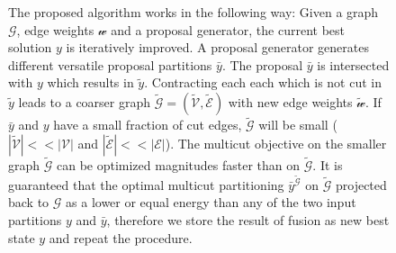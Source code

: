 \begin{figure}[H]
\caption{
    The proposed algorithm works in the following way:
    Given a graph $\mathcal{G}$, edge weights $\mathcal{w}$ and
    a proposal generator, the current best solution $y$ is iteratively improved.
    A proposal generator generates different versatile
    proposal partitions $\bar{y}$.
    The proposal  $\bar{y}$ is intersected with $y$ which results in
    $\tilde{y}$. Contracting each each which is not 
    cut in $\tilde{y}$ leads to a coarser graph  
    $\tilde{\mathcal{G}} = ( \tilde{\mathcal{V}}, \tilde{\mathcal{E}} )$ 
    with new edge weights $\tilde{\mathcal{w}}$.
    If  $\bar{y}$ and $y$ have a small fraction of cut edges, $\tilde{\mathcal{G}}$ will be small ( $|\tilde{\mathcal{V}}| << |\mathcal{V}|$
    and $|\tilde{\mathcal{E}}| << |\mathcal{E}|$).
    The multicut objective on the smaller graph $\tilde{\mathcal{G}}$ can be optimized magnitudes 
    faster than on $\tilde{\mathcal{G}}$.
    It is guaranteed that the optimal multicut partitioning $\bar{y}^{\tilde{\mathcal{G}}}$ on $\tilde{\mathcal{G}}$ projected 
    back to $\mathcal{G}$ as a lower or equal energy than any of the two input partitions $y$ and $\bar{y}$, 
    therefore we store the result of fusion as new best state $y$ and repeat the procedure.
}\label{fig:algo_graph}
\end{figure}


\begin{figure}[H]

%




\end{figure}

